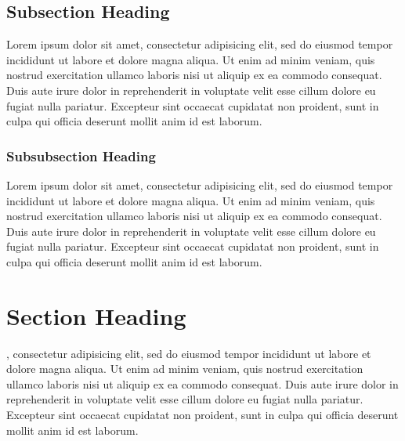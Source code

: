 \documentclass[11pt]{cauchy}
\begin{document}
\subsection{Subsection Heading}
Lorem ipsum dolor sit amet, consectetur adipisicing elit, sed do eiusmod tempor incididunt ut labore et dolore magna aliqua. Ut enim ad minim veniam, quis nostrud exercitation ullamco laboris nisi ut aliquip ex ea commodo consequat. Duis aute irure dolor in reprehenderit in voluptate velit esse cillum dolore eu fugiat nulla pariatur. Excepteur sint occaecat cupidatat non proident, sunt in culpa qui officia deserunt mollit anim id est laborum.

  \subsubsection{Subsubsection Heading}
  Lorem ipsum dolor sit amet, consectetur adipisicing elit, sed do eiusmod tempor incididunt ut labore et dolore magna aliqua. Ut enim ad minim veniam, quis nostrud exercitation ullamco laboris nisi ut aliquip ex ea commodo consequat. Duis aute irure dolor in reprehenderit in voluptate velit esse cillum dolore eu fugiat nulla pariatur. Excepteur sint occaecat cupidatat non proident, sunt in culpa qui officia deserunt mollit anim id est laborum.

\section{Section Heading}
, consectetur adipisicing elit, sed do eiusmod tempor incididunt ut labore et dolore magna aliqua. Ut enim ad minim veniam, quis nostrud exercitation ullamco laboris nisi ut aliquip ex ea commodo consequat. Duis aute irure dolor in reprehenderit in voluptate velit esse cillum dolore eu fugiat nulla pariatur. Excepteur sint occaecat cupidatat non proident, sunt in culpa qui officia deserunt mollit anim id est laborum.



\appendix




\nocite{*}
\clearpage
{\small}

\backmatter

\end{document}

